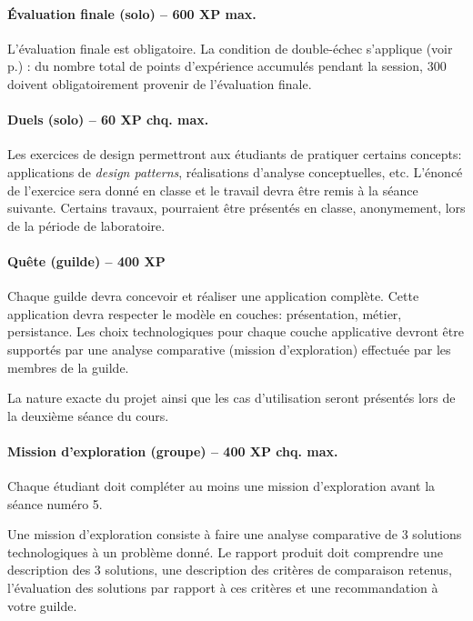 \documentclass{article}
\begin{document}
\paragraph{Évaluation finale (solo) -- 600 XP max.}
\label{par:Evaluation_finale_600_xp}

L'évaluation finale est obligatoire. La condition de double-échec s'applique (voir p.\pageref{sub:Evaluation}) : du nombre total de points d'expérience accumulés pendant la session, 300 doivent obligatoirement provenir de l'évaluation finale.

\paragraph{Duels (solo) -- 60 XP chq. max.}
\label{par:exercice_de_design_solo_60_xp_chq}

Les exercices de design permettront aux étudiants de pratiquer certains concepts: applications de \emph{design patterns}\cite{gamma1995dpe, evans2004domain, fowler2003poeaa}, réalisations d'analyse conceptuelles, etc. L'énoncé de l'exercice sera donné en classe et le travail devra être remis à la séance suivante. Certains travaux, pourraient être présentés en classe, anonymement, lors de la période de laboratoire.

\paragraph{Quête (guilde) -- 400 XP}
\label{par:quete}

Chaque guilde devra concevoir et réaliser une application complète. Cette application devra respecter le modèle en couches: présentation, métier, persistance. Les choix technologiques pour chaque couche applicative devront être supportés par une analyse comparative (mission d'exploration) effectuée par les membres de la guilde.

La nature exacte du projet ainsi que les cas d'utilisation seront présentés lors de la deuxième séance du cours.

\paragraph{Mission d'exploration (groupe) -- 400 XP chq. max.}
\label{par:mission_d_exploration_groupe_400_xp_chq}

Chaque étudiant doit compléter au moins une mission d'exploration avant la séance numéro 5.

Une mission d'exploration consiste à faire une analyse comparative de 3 solutions technologiques à un problème donné. Le rapport produit doit comprendre une description des 3 solutions, une description des critères de comparaison retenus, l'évaluation des solutions par rapport à ces critères et une recommandation à votre guilde.
\end{document}
